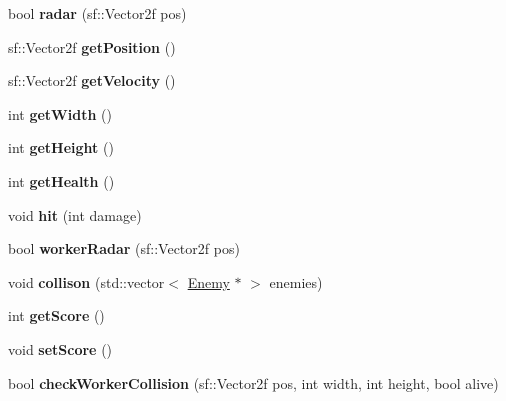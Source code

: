 \begin{DoxyCompactItemize}
bool {\bfseries radar} (sf\+::\+Vector2f pos)
\item 
\mbox{\label{class_predator___ship_afe058a9aff06a9fc4113021df8cd1381}} 
sf\+::\+Vector2f {\bfseries get\+Position} ()
\item 
\mbox{\label{class_predator___ship_aadb8afe210cffcf453f2a6d14d7ba186}} 
sf\+::\+Vector2f {\bfseries get\+Velocity} ()
\item 
\mbox{\label{class_predator___ship_a4795b1f5a0e4fc89ec76d5320b75c036}} 
int {\bfseries get\+Width} ()
\item 
\mbox{\label{class_predator___ship_a7a0edb94e58718dd30d0803132e68e79}} 
int {\bfseries get\+Height} ()
\item 
\mbox{\label{class_predator___ship_a6cc0211a134ac56f11a2e1f4172fc32c}} 
int {\bfseries get\+Health} ()
\item 
\mbox{\label{class_predator___ship_a7e2990cfdf148f330898715c384706c0}} 
void {\bfseries hit} (int damage)
\item 
\mbox{\label{class_predator___ship_ad8342d6a74425727e5e6e8f65e92e3a5}} 
bool {\bfseries worker\+Radar} (sf\+::\+Vector2f pos)
\item 
\mbox{\label{class_predator___ship_ace25b7dc8a35303462ea776ce28cc1c1}} 
void {\bfseries collison} (std\+::vector$<$ \mbox{\hyperlink{class_enemy}{Enemy}} $\ast$ $>$ enemies)
\item 
\mbox{\label{class_predator___ship_aebf2b4fc48e1337064441e79ddb5913f}} 
int {\bfseries get\+Score} ()
\item 
\mbox{\label{class_predator___ship_a51cef7c74250e2dbf2e362d6ada33e0e}} 
void {\bfseries set\+Score} ()
\item 
\mbox{\label{class_predator___ship_aeba4c0d0b23edbf52c04dbb8c158737c}} 
bool {\bfseries check\+Worker\+Collision} (sf\+::\+Vector2f pos, int width, int height, bool alive)

\end{DoxyCompactItemize}
